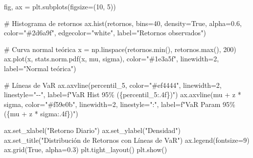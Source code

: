 \documentclass[
  spanish,
  letterpaper,
  DIV=11,
  numbers=noendperiod]{scrreprt}
\newenvironment{Shaded}{\begin{snugshade}}{\end{snugshade}}
\newcommand{\BuiltInTok}[1]{\textcolor[rgb]{0.00,0.23,0.31}{#1}}
\newcommand{\CommentTok}[1]{\textcolor[rgb]{0.37,0.37,0.37}{#1}}
\newcommand{\DecValTok}[1]{\textcolor[rgb]{0.68,0.00,0.00}{#1}}
\newcommand{\FloatTok}[1]{\textcolor[rgb]{0.68,0.00,0.00}{#1}}
\newcommand{\NormalTok}[1]{\textcolor[rgb]{0.00,0.23,0.31}{#1}}
\newcommand{\OperatorTok}[1]{\textcolor[rgb]{0.37,0.37,0.37}{#1}}
\newcommand{\SpecialCharTok}[1]{\textcolor[rgb]{0.37,0.37,0.37}{#1}}
\newcommand{\SpecialStringTok}[1]{\textcolor[rgb]{0.13,0.47,0.30}{#1}}
\newcommand{\StringTok}[1]{\textcolor[rgb]{0.13,0.47,0.30}{#1}}
\newcommand{\VariableTok}[1]{\textcolor[rgb]{0.07,0.07,0.07}{#1}}
\begin{document}
\begin{Shaded}
\begin{Highlighting}[]
\NormalTok{fig, ax }\OperatorTok{=}\NormalTok{ plt.subplots(figsize}\OperatorTok{=}\NormalTok{(}\DecValTok{10}\NormalTok{, }\DecValTok{5}\NormalTok{))}

\CommentTok{\# Histograma de retornos}
\NormalTok{ax.hist(retornos, bins}\OperatorTok{=}\DecValTok{40}\NormalTok{, density}\OperatorTok{=}\VariableTok{True}\NormalTok{, alpha}\OperatorTok{=}\FloatTok{0.6}\NormalTok{, color}\OperatorTok{=}\StringTok{"\#2d6a9f"}\NormalTok{, }
\NormalTok{        edgecolor}\OperatorTok{=}\StringTok{"white"}\NormalTok{, label}\OperatorTok{=}\StringTok{"Retornos observados"}\NormalTok{)}

\CommentTok{\# Curva normal teórica}
\NormalTok{x }\OperatorTok{=}\NormalTok{ np.linspace(retornos.}\BuiltInTok{min}\NormalTok{(), retornos.}\BuiltInTok{max}\NormalTok{(), }\DecValTok{200}\NormalTok{)}
\NormalTok{ax.plot(x, stats.norm.pdf(x, mu, sigma), color}\OperatorTok{=}\StringTok{"\#1e3a5f"}\NormalTok{, linewidth}\OperatorTok{=}\DecValTok{2}\NormalTok{, }
\NormalTok{        label}\OperatorTok{=}\StringTok{"Normal teórica"}\NormalTok{)}

\CommentTok{\# Líneas de VaR}
\NormalTok{ax.axvline(percentil\_5, color}\OperatorTok{=}\StringTok{"\#ef4444"}\NormalTok{, linewidth}\OperatorTok{=}\DecValTok{2}\NormalTok{, linestyle}\OperatorTok{=}\StringTok{"{-}{-}"}\NormalTok{, }
\NormalTok{           label}\OperatorTok{=}\SpecialStringTok{f"VaR Hist 95\% (}\SpecialCharTok{\{}\NormalTok{percentil\_5}\SpecialCharTok{:.4f\}}\SpecialStringTok{)"}\NormalTok{)}
\NormalTok{ax.axvline(mu }\OperatorTok{+}\NormalTok{ z }\OperatorTok{*}\NormalTok{ sigma, color}\OperatorTok{=}\StringTok{"\#f59e0b"}\NormalTok{, linewidth}\OperatorTok{=}\DecValTok{2}\NormalTok{, linestyle}\OperatorTok{=}\StringTok{":"}\NormalTok{, }
\NormalTok{           label}\OperatorTok{=}\SpecialStringTok{f"VaR Param 95\% (}\SpecialCharTok{\{}\NormalTok{mu }\OperatorTok{+}\NormalTok{ z }\OperatorTok{*}\NormalTok{ sigma}\SpecialCharTok{:.4f\}}\SpecialStringTok{)"}\NormalTok{)}

\NormalTok{ax.set\_xlabel(}\StringTok{"Retorno Diario"}\NormalTok{)}
\NormalTok{ax.set\_ylabel(}\StringTok{"Densidad"}\NormalTok{)}
\NormalTok{ax.set\_title(}\StringTok{"Distribución de Retornos con Líneas de VaR"}\NormalTok{)}
\NormalTok{ax.legend(fontsize}\OperatorTok{=}\DecValTok{9}\NormalTok{)}
\NormalTok{ax.grid(}\VariableTok{True}\NormalTok{, alpha}\OperatorTok{=}\FloatTok{0.3}\NormalTok{)}
\NormalTok{plt.tight\_layout()}
\NormalTok{plt.show()}
\end{Highlighting}
\end{Shaded}
\end{document}

